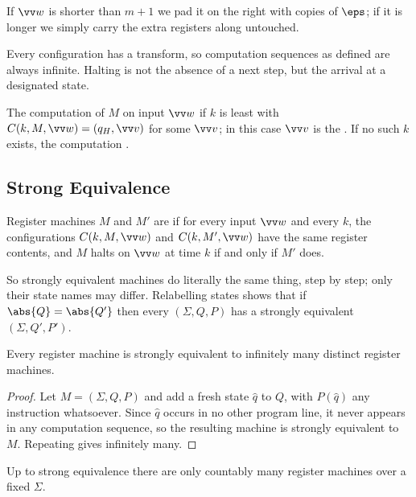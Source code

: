 If $\vv w$ is shorter than $m+1$ we pad it on the right with copies of $\eps$; if it is longer we simply carry the extra registers along untouched.

\begin{remark}
	Every configuration has a transform, so computation sequences as defined are always infinite. Halting is not the absence of a next step, but the arrival at a designated state.
\end{remark}

\begin{definition}[Halting]
	The computation of $M$ on input $\vv w$  if $k$ is least with $C(k,M,\vv w) = (q_H, \vv v)$ for some $\vv v$; in this case $\vv v$ is the . If no such $k$ exists, the computation .
\end{definition}

\subsection{Strong Equivalence}

\begin{definition}
	Register machines $M$ and $M'$ are  if for every input $\vv w$ and every $k$, the configurations $C(k,M,\vv w)$ and $C(k,M',\vv w)$ have the same register contents, and $M$ halts on $\vv w$ at time $k$ if and only if $M'$ does.
\end{definition}

So strongly equivalent machines do literally the same thing, step by step; only their state names may differ. Relabelling states shows that if $\abs{Q} = \abs{Q'}$ then every $(\Sigma,Q,P)$ has a strongly equivalent $(\Sigma,Q',P')$.

\begin{proposition}\label{prop:padding}
	Every register machine is strongly equivalent to infinitely many distinct register machines.
\end{proposition}

\begin{proof}
	Let $M = (\Sigma,Q,P)$ and add a fresh state $\hat q$ to $Q$, with $P(\hat q)$ any instruction whatsoever. Since $\hat q$ occurs in no other program line, it never appears in any computation sequence, so the resulting machine is strongly equivalent to $M$. Repeating gives infinitely many.
\end{proof}

\begin{proposition}\label{prop:countablymanyrm}
	Up to strong equivalence there are only countably many register machines over a fixed $\Sigma$.
\end{proposition}

